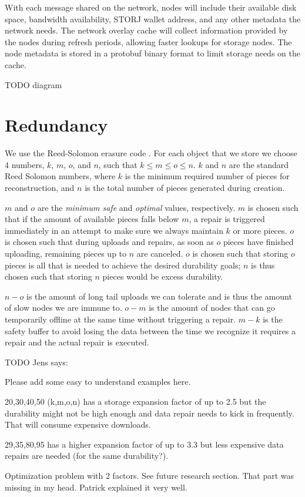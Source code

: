 \documentclass[11pt,fleqn,openany]{book}
\newcommand{\todo}[1]{{\color{red} TODO #1 }}
\begin{document}
With each message shared on the network, nodes will include their available
disk space, bandwidth availability, STORJ wallet address, and any other
metadata the network needs.
The network overlay cache will collect information provided by the nodes
during refresh periods, allowing faster lookups for storage nodes.
The node metadata is stored in a protobuf binary format to limit storage
needs on the cache.

\todo{diagram}

\section{Redundancy}

We use the Reed-Solomon erasure code \cite{rs}. For each object that we store
we choose 4 numbers, $k$, $m$, $o$, and $n$, such that $k\le m\le o\le n$.
$k$ and $n$ are the standard Reed Solomon numbers, where $k$ is the minimum
required number of pieces for reconstruction, and $n$ is the total number of
pieces generated during creation.

$m$ and $o$ are the {\em minimum safe} and {\em optimal} values, respectively.
$m$ is chosen such that if the amount of available pieces falls below $m$, a
repair is triggered immediately in an attempt to make sure we always maintain
$k$ or more pieces. $o$ is chosen such that during uploads and repairs,
as soon as $o$ pieces have finished uploading, remaining pieces up to $n$ are
canceled.
$o$ is chosen such that storing $o$ pieces is all that is
needed to achieve the desired durability goals; $n$ is thus chosen such that
storing $n$ pieces would be excess durability.

$n-o$ is the amount of long tail uploads we can tolerate and is thus the amount
of slow nodes we are immune to. $o-m$ is the amount of nodes that can go
temporarily offline at the same time without triggering a repair. $m-k$ is the
safety buffer to avoid losing the data between the time we recognize it requires
a repair and the actual repair is executed.

\todo{Jens says:

Please add some easy to understand examples here.

20,30,40,50 (k,m,o,n) has a storage expansion factor of up to 2.5 but the durability might not be high enough and data repair needs to kick in frequently. That will consume expensive downloads.

29,35,80,95 has a higher expansion factor of up to 3.3 but less expensive data repairs are needed (for the same durability?).

Optimization problem with 2 factors. See future research section. That part was missing in my head. Patrick explained it very well.
}
\end{document}
